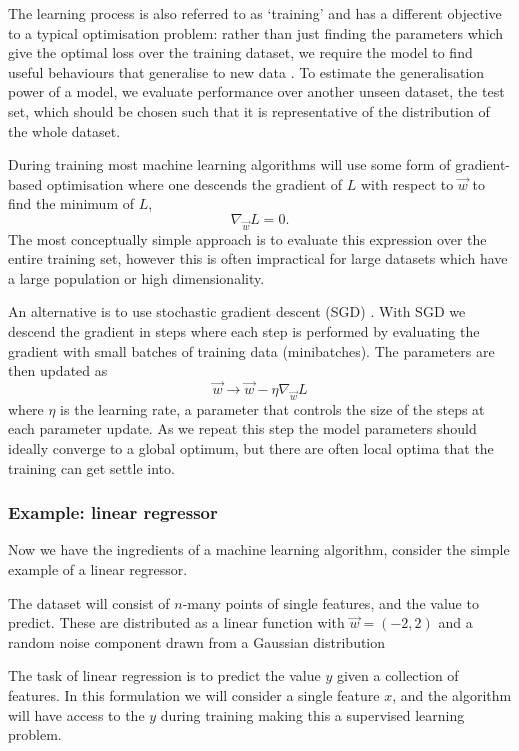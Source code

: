 The learning process is also referred to as `training' and has a different objective to a typical optimisation problem: rather than just finding the parameters which give the optimal loss over the training dataset, we require the model to find useful behaviours that generalise to new data \cite{DeepLearningBook}. 
To estimate the generalisation power of a model, we evaluate performance over another unseen dataset, the test set, which should be chosen such that it is representative of the distribution of the whole dataset.


During training most machine learning algorithms will use some form of gradient-based optimisation where one descends the gradient of $L$ with respect to $\vec{w}$ to find the minimum of $L$,
\begin{equation}
    \nabla_{\vec{w}}L = 0.
\end{equation}
The most conceptually simple approach is to evaluate this expression over the entire training set, however this is often impractical for large datasets which have a large population or high dimensionality. 

An alternative is to use stochastic gradient descent (SGD) \cite{DeepLearningBook}. With SGD we descend the gradient in steps where each step is performed by evaluating the gradient with small batches of training data (minibatches). 
The parameters are then updated as
\begin{equation}
    \vec{w} \rightarrow \vec{w} - \eta\nabla_{\vec{w}}L
\end{equation}
where $\eta$ is the learning rate, a parameter that controls the size of the steps at each parameter update. As we repeat this step the model parameters should ideally converge to a global optimum, but there are often local optima that the training can get settle into. 


\subsubsection{Example: linear regressor}
Now we have the ingredients of a machine learning algorithm, consider the simple example of a linear regressor. 

The dataset will consist of $n$-many points of single features, and the value to predict. These are distributed as a linear function with $\vec{w} = (-2,2)$ and a random noise component drawn from a Gaussian distribution

The task of linear regression is to predict the value $y$ given a collection of features. In this formulation we will consider a single feature $x$, and the algorithm will have access to the $y$ during training making this a supervised learning problem. 

